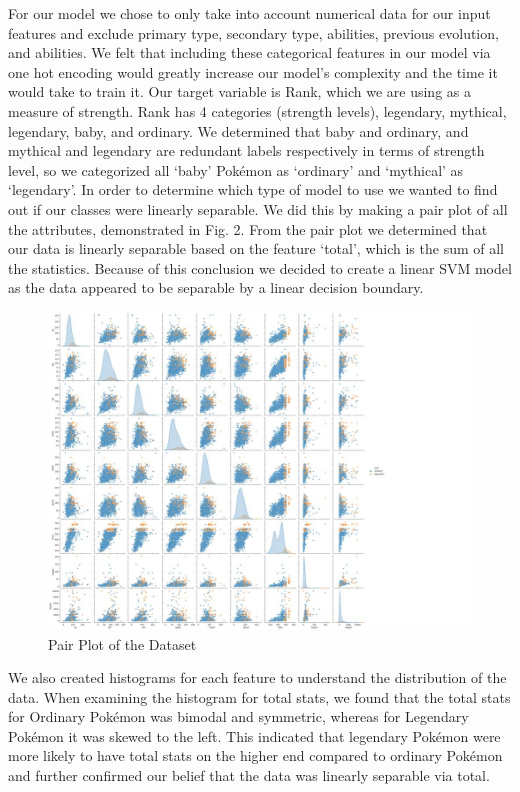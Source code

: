 \documentclass[conference]{IEEEtran}
\begin{document}
For our model we chose to only take into account numerical data for our input features and exclude primary type, secondary type, abilities, previous evolution, and abilities. We felt that including these categorical features in our model via one hot encoding would greatly increase our model's complexity and the time it would take to train it. Our target variable is Rank, which we are using as a measure of strength. Rank has 4 categories (strength levels), legendary, mythical, legendary, baby, and ordinary. We determined that baby and ordinary, and mythical and legendary are redundant labels respectively in terms of strength level, so we categorized all ‘baby' Pokémon as ‘ordinary' and ‘mythical' as ‘legendary'. 
In order to determine which type of model to use we wanted to find out if our classes were linearly separable. We did this by making a pair plot of all the attributes, demonstrated in Fig. 2. From the pair plot we determined that our data is linearly separable based on the feature ‘total', which is the sum of all the statistics. Because of this conclusion we decided to create a linear SVM model as the data appeared to be separable by a linear decision boundary.

\begin{figure}
    \centering
    \includegraphics[width=1.3\textwidth]{Fig2.jpg} %
    \caption{Pair Plot of the Dataset}
    \label{fig:dataset-pairplot}
\end{figure}
We also created histograms for each feature to understand the distribution of the data. When examining the histogram for total stats, we found that the total stats for Ordinary Pokémon was bimodal and symmetric, whereas for Legendary Pokémon it was skewed to the left. This indicated that legendary Pokémon were more likely to have total stats on the higher end compared to ordinary Pokémon and further confirmed our belief that the data was linearly separable via total.
\end{document}
